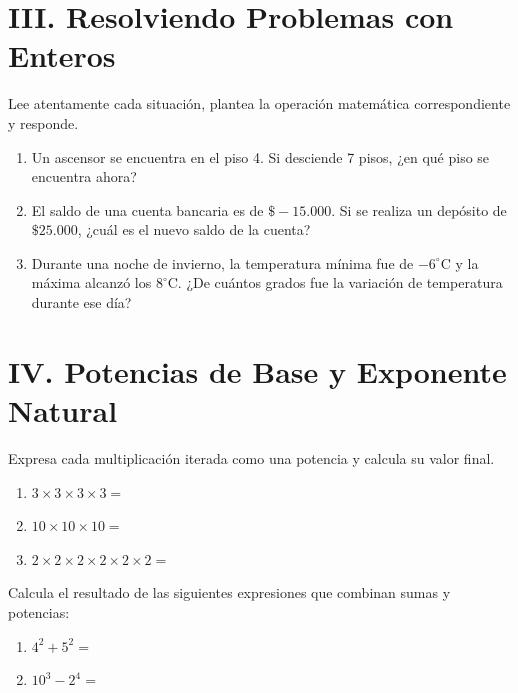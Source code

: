 \documentclass[12pt, letterpaper]{article}
\begin{document}
\vspace{0.5cm}

\section*{III. Resolviendo Problemas con Enteros}
\noindent Lee atentamente cada situación, plantea la operación matemática correspondiente y responde.

\begin{enumerate}[label=\arabic*.]
    \item Un ascensor se encuentra en el piso 4. Si desciende 7 pisos, ¿en qué piso se encuentra ahora?
    \vspace{1.5cm}
    \item El saldo de una cuenta bancaria es de $\$-15.000$. Si se realiza un depósito de $\$25.000$, ¿cuál es el nuevo saldo de la cuenta?
    \vspace{1.5cm}
    \item Durante una noche de invierno, la temperatura mínima fue de $-6^{\circ}\text{C}$ y la máxima alcanzó los $8^{\circ}\text{C}$. ¿De cuántos grados fue la variación de temperatura durante ese día?
    \vspace{1.5cm}
\end{enumerate}

\section*{IV. Potencias de Base y Exponente Natural}
\noindent Expresa cada multiplicación iterada como una potencia y calcula su valor final.

\begin{enumerate}[label=\alph*)]
    \item $3 \times 3 \times 3 \times 3 = $ \vspace{0.5cm}
    \item $10 \times 10 \times 10 = $ \vspace{0.5cm}
    \item $2 \times 2 \times 2 \times 2 \times 2 \times 2 = $
\end{enumerate}

\vspace{0.5cm}

\noindent Calcula el resultado de las siguientes expresiones que combinan sumas y potencias:

\begin{enumerate}[label=\alph*), start=4]
    \item $4^2 + 5^2 = $ \vspace{1cm}
    \item $10^3 - 2^4 = $ \vspace{1cm}
\end{enumerate}
\end{document}
